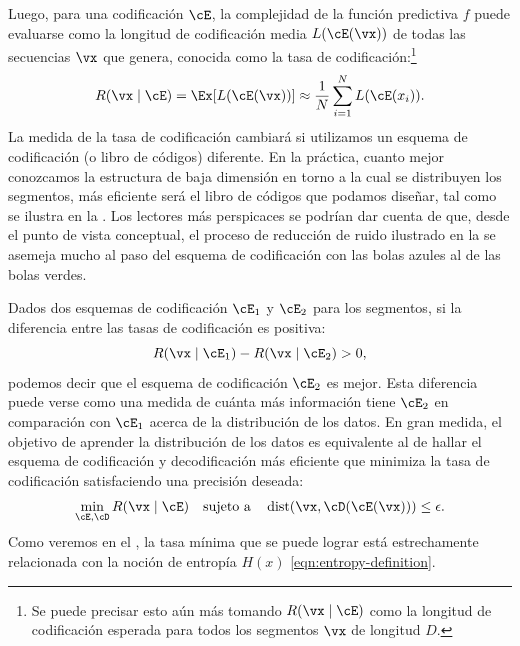 \documentclass[../../book-main_es.tex]{subfiles}
\begin{document}
Luego, para una codificación \(\cE\), la complejidad de la función
predictiva \(f\) puede evaluarse como la longitud de codificación media
\(L(\cE(\vx))\) de todas las secuencias \(\vx\) que genera, conocida como la
tasa de codificación:\footnote{Se puede precisar esto aún más tomando \(R(\vx
    \mid \cE)\) como la longitud de codificación esperada para todos los segmentos \(\vx\)
de longitud \(D\).}
\begin{equation}
    R(\vx \mid \cE) = \Ex[L(\cE(\vx))] \approx \frac{1}{N}\sum_{i=1}^{N}
    L(\cE(x_{i})).
    \label{eqn:coding-rate}
\end{equation}
La medida de la tasa de codificación cambiará si utilizamos un esquema de codificación
(o libro de códigos) diferente. En la práctica, cuanto mejor conozcamos la
estructura de baja dimensión en torno a la cual se distribuyen los segmentos,
más eficiente será el libro de códigos que podamos diseñar, tal como se ilustra en la
. Los lectores más perspicaces se podrían dar cuenta de que,
desde el punto de vista conceptual, el proceso de reducción de ruido ilustrado en la
 se asemeja mucho al paso del esquema de codificación
con las bolas azules al de las bolas verdes.

Dados dos esquemas de codificación \(\cE_{1}\) y \(\cE_{2}\) para los
segmentos, si la diferencia entre las tasas de codificación es positiva:
\begin{equation}
    R(\vx \mid \cE_{1}) -  R(\vx \mid \cE_{2}) > 0,
\end{equation}
podemos decir que el esquema de codificación \(\cE_{2}\) es mejor. Esta diferencia
puede verse como una medida de cuánta más información tiene \(\cE_{2}\) en 
comparación con \(\cE_{1}\) acerca de la distribución de los datos. En gran medida,
el objetivo de aprender la distribución de los datos es equivalente al de
hallar el esquema de codificación y decodificación más eficiente que
minimiza la tasa de codificación satisfaciendo una precisión deseada:
\begin{equation}
    \min_{\cE, \cD} R(\vx \mid \cE) \quad \text{sujeto a} \quad
    \operatorname{dist}(\vx, \cD(\cE(\vx))) \leq \epsilon.
\end{equation}
Como veremos en el , la tasa mínima que se puede lograr está
estrechamente relacionada con la noción de entropía \(H(x)\)
\eqref{eqn:entropy-definition}.
\end{document}
